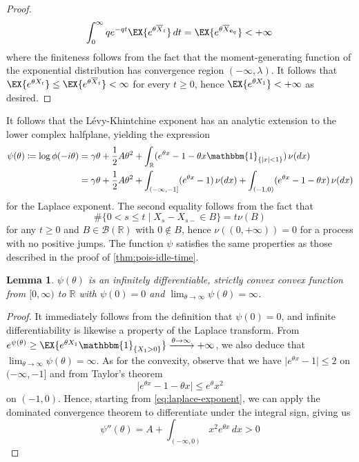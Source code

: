 \documentclass[titlepage]{article}
\theoremstyle{plain}
\newtheorem{lemma}{Lemma}[section]
\theoremstyle{definition}
\begin{document}
\begin{proof}
  \begin{equation}
    \int_0^\infty q e^{-q t} \EX{e^{\theta \overline{X}_t}} \, dt = \EX{e^{\theta \overline{X}_{\mathbf{e}_q}}} < +\infty \,
  \end{equation}
  where the finiteness follows from the fact that the moment-generating function of the exponential distribution has convergence region $(-\infty, \lambda)$. It follows that $\EX{e^{\theta X_t}} \leq \EX{e^{\theta \overline{X}_t}} < \infty$ for every $t \geq 0$, hence $\EX{e^{\theta X_1}} < +\infty$ as desired.
\end{proof}

It follows that the Lévy-Khintchine exponent has an analytic extension to the lower complex halfplane, yielding the expression
\begin{align} \label{eq:laplace-exponent}
  \psi(\theta) \coloneqq \log{\phi(-i \theta)} & = \gamma \theta + \frac{1}{2} A \theta^2 + \int_\mathbb{R} (e^{\theta x} - 1 - \theta x \mathbbm{1}_{\{ \vert x \vert < 1 \}}) \, \nu(dx)               \\
                                               & = \gamma \theta + \frac{1}{2} A \theta^2 + \int_{(-\infty, -1]} (e^{\theta x} - 1) \, \nu(dx) + \int_{(-1, 0)} (e^{\theta x} - 1 - \theta x) \, \nu(dx)
\end{align}
for the Laplace exponent. The second equality follows from the fact that
\begin{equation}
  \#\{ 0 < s \leq t \mid X_s - X_{s-} \in B \} = t \nu(B)
\end{equation}
for any $t \geq 0$ and $B \in \mathcal{B}(\mathbb{R})$ with $0 \notin B$, hence $\nu((0, +\infty)) = 0$ for a process with no positive jumps. The function $\psi$ satisfies the same properties as those described in the proof of \cref{thm:pois-idle-time}.

\begin{lemma}
  $\psi(\theta)$ is an infinitely differentiable, strictly convex convex function from $[0, \infty)$ to $\mathbb{R}$ with $\psi(0) = 0$ and $\lim_{\theta \to \infty} \psi(\theta) = \infty$.
\end{lemma}

\begin{proof}
  It immediately follows from the definition that $\psi(0) = 0$, and infinite differentiability is likewise a property of the Laplace transform. From $e^{\psi(\theta)} \geq \EX{e^{\theta X_1} \mathbbm{1}_{\{ X_1 > 0\}}} \xrightarrow{\theta \to \infty} +\infty$, we also deduce that $\lim_{\theta \to \infty} \psi(\theta) = \infty$. As for the convexity, observe that we have $\vert e^{\theta x} - 1 \vert \leq 2$ on $(-\infty, -1]$ and from Taylor's theorem
  \begin{equation}
    \vert e^{\theta x} - 1 - \theta x \vert \leq e^\theta x^2
  \end{equation}
  on $(-1, 0)$. Hence, starting from \cref{eq:laplace-exponent}, we can apply the dominated convergence theorem to differentiate under the integral sign, giving us
  \begin{equation}
    \psi''(\theta) = A + \int_{(-\infty, 0)} x^2 e^{\theta x} \, dx > 0
  \end{equation}
\end{proof}
\end{document}
